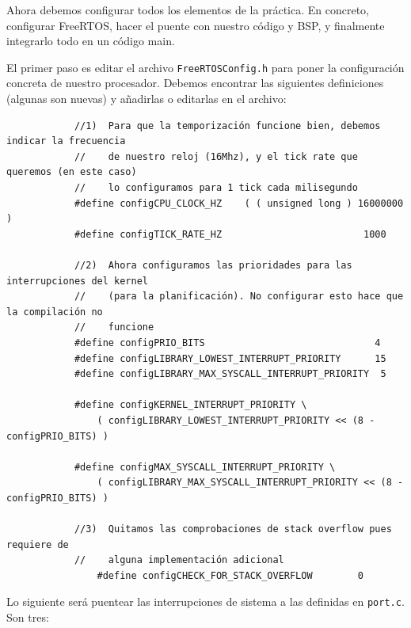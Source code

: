 \documentclass[../main.tex]{subfiles}
\begin{document}
        Ahora debemos configurar todos los elementos de la práctica. En concreto, configurar FreeRTOS, hacer el puente con nuestro código y BSP, y finalmente integrarlo todo en un código main.

        El primer paso es editar el archivo \texttt{FreeRTOSConfig.h} para poner la configuración concreta de nuestro procesador. Debemos encontrar las siguientes definiciones (algunas son nuevas) y añadirlas o editarlas en el archivo:

        \begin{lstlisting}
            //1)  Para que la temporización funcione bien, debemos indicar la frecuencia 
            //    de nuestro reloj (16Mhz), y el tick rate que queremos (en este caso)
            //    lo configuramos para 1 tick cada milisegundo
            #define configCPU_CLOCK_HZ    ( ( unsigned long ) 16000000 )
            #define configTICK_RATE_HZ                         1000

            //2)  Ahora configuramos las prioridades para las interrupciones del kernel
            //    (para la planificación). No configurar esto hace que la compilación no
            //    funcione
            #define configPRIO_BITS                              4
            #define configLIBRARY_LOWEST_INTERRUPT_PRIORITY      15
            #define configLIBRARY_MAX_SYSCALL_INTERRUPT_PRIORITY  5

            #define configKERNEL_INTERRUPT_PRIORITY \
                ( configLIBRARY_LOWEST_INTERRUPT_PRIORITY << (8 - configPRIO_BITS) )

            #define configMAX_SYSCALL_INTERRUPT_PRIORITY \
                ( configLIBRARY_MAX_SYSCALL_INTERRUPT_PRIORITY << (8 - configPRIO_BITS) )

            //3)  Quitamos las comprobaciones de stack overflow pues requiere de 
            //    alguna implementación adicional
                #define configCHECK_FOR_STACK_OVERFLOW        0
        \end{lstlisting}

        Lo siguiente será puentear las interrupciones de sistema a las definidas en \texttt{port.c}. Son tres:
\end{document}
